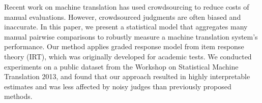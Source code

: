 Recent work on machine translation has used crowdsourcing to reduce costs of manual evaluations. However, crowdsourced judgments are often biased and inaccurate. In this paper, we present a statistical model that aggregates many manual pairwise comparisons to robustly measure a machine translation system's performance. Our method applies graded response model from item response theory (IRT), which was originally developed for academic tests. We conducted experiments on a public dataset from the Workshop on Statistical Machine Translation 2013, and found that our approach resulted in highly interpretable estimates and was less affected by noisy judges than previously proposed methods.
